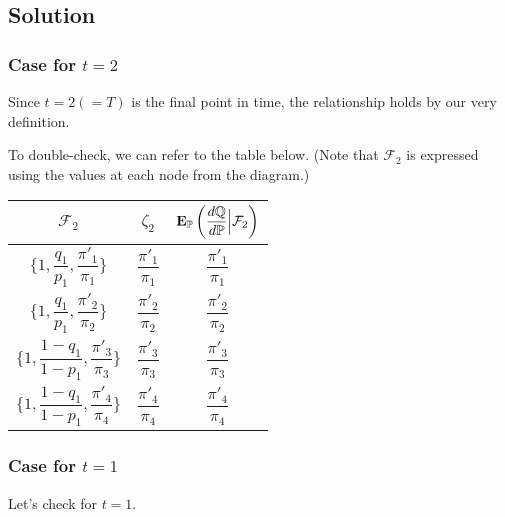 \documentclass[uplatex,a4j,12pt,dvipdfmx]{jsarticle}
\begin{document}
\subsection{Solution}

\subsubsection{Case for $t=2$}

Since $t=2(=T)$ is the final point in time, the relationship holds by our very definition.

To double-check, we can refer to the table below. (Note that $\mathcal{F}_{2}$ is expressed using the values at each node from the diagram.)

\begin{center}
	\begin{tabular}{|c|c|c|} \hline
		$\mathcal{F}_{2}$                                                             & $\zeta_{2}$                     & ${\bf E}_{\mathbb{P}} \left( \dfrac{ d \mathbb{Q} }{ d \mathbb{P} } \Big| \mathcal{F}_{2} \right)$ \\ \hline \hline
		$\Big\{ 1 , \dfrac{q_{1}}{p_{1}} , \dfrac{ \pi'_{1} }{ \pi_{1} } \Big\} $     & $\dfrac{ \pi'_{1} }{ \pi_{1} }$ & $\dfrac{ \pi'_{1} }{ \pi_{1} }$                                                                    \\ \hline
		$\Big\{ 1 , \dfrac{q_{1}}{p_{1}} , \dfrac{ \pi'_{2} }{ \pi_{2} } \Big\} $     & $\dfrac{ \pi'_{2} }{ \pi_{2} }$ & $\dfrac{ \pi'_{2} }{ \pi_{2} }$                                                                    \\ \hline
		$\Big\{ 1 , \dfrac{1-q_{1}}{1-p_{1}} , \dfrac{ \pi'_{3} }{ \pi_{3} } \Big\} $ & $\dfrac{ \pi'_{3} }{ \pi_{3} }$ & $\dfrac{ \pi'_{3} }{ \pi_{3} }$                                                                    \\ \hline
		$\Big\{ 1 , \dfrac{1-q_{1}}{1-p_{1}} , \dfrac{ \pi'_{4} }{ \pi_{4} } \Big\} $ & $\dfrac{ \pi'_{4} }{ \pi_{4} }$ & $\dfrac{ \pi'_{4} }{ \pi_{4} }$                                                                    \\ \hline
	\end{tabular}
\end{center}
\subsubsection{Case for $t=1$}

Let's check for $t=1$.
\end{document}
